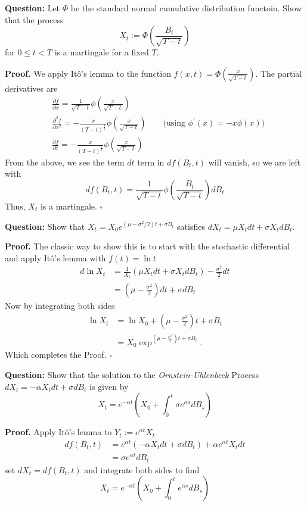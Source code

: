\documentclass{article}
\begin{document}
\begin{tcolorbox}[colframe=black,colback=gray!5,boxrule=0.5pt]
\textbf{Question:} Let $\Phi$ be the standard normal cumulative distribution functoin. Show that the process $$X_t := \Phi\left(\frac{B_t}{\sqrt{T-t}}\right)$$ for $0\leq t<T$ is a martingale for a fixed $T$.
\end{tcolorbox}
\textbf{Proof.} We apply Itô's lemma to the function $f(x,t) = \Phi(\frac{x}{\sqrt{T-t}})$. The partial derivatives are 
\begin{align*}
    & \frac{\partial f}{\partial x} = \frac{1}{\sqrt{T-t}} \phi\left(\frac{x}{\sqrt{T-t}}\right) \\
    & \frac{\partial^2 f}{\partial x^2} = - \frac{x}{(T-t)^{\frac{3}{2}}} \phi\left(\frac{x}{\sqrt{T-t}}\right) \quad\quad \text{(using $\phi^\prime(x) = -x\phi(x)$)} \\
    & \frac{\partial f}{\partial t} = -\frac{x}{(T-t)^{\frac{3}{2}}}\phi\left(\frac{x}{\sqrt{T-t}}\right)
\end{align*}
From the above, we see the term $dt$ term in $df(B_t,t)$ will vanish, so we are left with 
$$df(B_t,t) = \frac{1}{\sqrt{T-t}} \phi\left(\frac{B_t}{\sqrt{T-t}}\right)dB_t$$
Thus, $X_t$ is a martingale. $\square$




\begin{tcolorbox}[colframe=black,colback=gray!5,boxrule=0.5pt]
\textbf{Question:} Show that $X_t = X_0 e^{(\mu-\sigma^2/2)t + \sigma B_t}$ satisfies $dX_t =\mu X_t dt + \sigma X_t dB_t$.
\end{tcolorbox}
\textbf{Proof.} The classic way to show this is to start with the stochastic differential and apply Itô's lemma with $f(t) = \ln t$
\begin{align*}
    d\ln X_t  &= \frac{1}{X_t}(\mu X_t dt + \sigma X_t dB_t) - \frac{\sigma^2}{2}dt \\
              &= \left(\mu - \frac{\sigma^2}{2}\right)dt + \sigma dB_t
\end{align*}
Now by integrating both sides
\begin{align*}
    \ln X_t &= \ln X_0 + \left(\mu - \frac{\sigma^2}{2}\right)t + \sigma B_t \\
    &= X_0 \exp^{\left(\mu - \frac{\sigma^2}{2}\right)t + \sigma B_t}.
\end{align*}
Which completes the Proof. $\square$

\begin{tcolorbox}[colframe=black,colback=gray!5,boxrule=0.5pt]
\textbf{Question:} Show that the solution to the \textit{Ornstein-Uhlenbeck} Process $dX_t = -\alpha X_tdt + \sigma dB_t$ is given by 
$$X_t = e^{-\alpha t}\left(X_0 + \int_0^t\sigma e^{\alpha s}dB_s\right)$$
\end{tcolorbox}
\textbf{Proof.} Apply Itô's lemma to $Y_t := e^{\alpha t} X_t$ 
\begin{align*}
    df(B_t, t) &= e^{\alpha t}(-\alpha X_tdt + \sigma dB_t) + \alpha e^{\alpha t}X_t dt \\
               &= \sigma e^{\alpha t} dB_t
\end{align*}
set $dX_t = df(B_t,t)$ and integrate both sides to find 
$$X_t = e^{-\alpha t}\left(X_0 + \int_0^t e^{\alpha s}dB_s\right)$$
\end{document}

